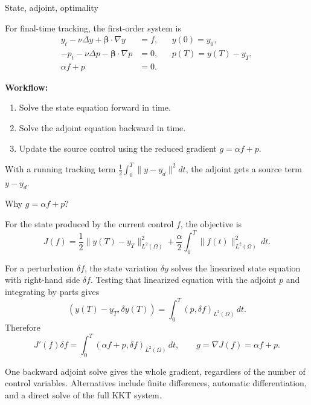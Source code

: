 \documentclass[aspectratio=169, 11pt]{beamer}
\begin{document}
\begin{frame}{State, adjoint, optimality}

For final-time tracking, the first-order system is
\[
\begin{aligned}
    y_t - \nu\Delta y + \boldsymbol{\beta}\cdot\nabla y &= f,
    && y(0)=y_0,\\
    -p_t - \nu\Delta p - \boldsymbol{\beta}\cdot\nabla p &= 0,
    && p(T)=y(T)-y_T,\\
    \alpha f + p &= 0.
\end{aligned}
\]

\bigskip
\small
\textbf{Workflow:}
\begin{enumerate}
    \item Solve the state equation forward in time.
    \item Solve the adjoint equation backward in time.
    \item Update the source control using the reduced gradient
          $g=\alpha f+p$.
\end{enumerate}

\medskip
With a running tracking term
$\frac12\int_0^T\|y-y_d\|^2dt$, the adjoint gets a source term $y-y_d$.

\end{frame}

\begin{frame}{Why $g=\alpha f+p$?}

For the state produced by the current control $f$, the objective is
\[
    J(f)=\frac12\|y(T)-y_T\|_{L^2(\Omega)}^2
    +\frac{\alpha}{2}\int_0^T\|f(t)\|_{L^2(\Omega)}^2\,dt .
\]

\small
For a perturbation $\delta f$, the state variation $\delta y$ solves the
linearized state equation with right-hand side $\delta f$.  Testing that
linearized equation with the adjoint $p$ and integrating by parts gives
\[
    (y(T)-y_T,\delta y(T))
    =
    \int_0^T (p,\delta f)_{L^2(\Omega)}\,dt .
\]
Therefore
\[
    J'(f)\delta f
    =
    \int_0^T (\alpha f+p,\delta f)_{L^2(\Omega)}\,dt,
    \qquad
    g=\nabla J(f)=\alpha f+p .
\]

\medskip
\scriptsize
One backward adjoint solve gives the whole gradient, regardless of the number
of control variables. Alternatives include finite differences, automatic
differentiation, and a direct solve of the full KKT system.

\end{frame}
\end{document}
